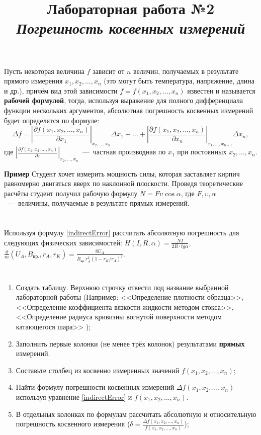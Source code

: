 \documentclass[14pt,a4paper]{article}
\title{Лабораторная работа №2 \\ \textit{Погрешность косвенных измерений}}
\begin{document}
\maketitle
Пусть некоторая величина $f$ зависит от $n$ величин, получаемых в результате прямого измерения  $x_1, x_2, \ldots, x_n$ (это могут быть температура, напряжение, длина и др.), причём вид этой зависимости $f = f(x_1, x_2, \ldots, x_n)$ известен и называется \textbf{рабочей формулой}, тогда, используя выражение для полного дифференциала функции нескольких аргументов, абсолютная погрешность косвенных измерений будет определятся по формуле:
\begin{equation} \label{indirectError}
    \Delta f = \left | \frac{\partial f(x_1, x_2, \ldots, x_n)}{\partial x_1} \right |_{x_2, \ldots, x_n} \Delta x_1 + \ldots + \left | \frac{\partial f(x_1, x_2, \ldots, x_n)}{\partial x_n} \right |_{x_1, \ldots, x_{n-1}} \Delta x_n,
\end{equation}
где $\left | \frac{\partial f(x_1, x_2, \ldots, x_n)}{\partial x} \right |_{x_2, \ldots, x_n}$~---~частная производная по $x_1$ при постоянных $x_2, \ldots, x_n$.

\textbf{Пример}
Студент хочет измерить мощность силы, которая заставляет кирпич равномерно двигаться вверх по наклонной плоскости. Проведя теоретические расчёты студент получил рабочую формулу $N = F\upsilon\cos{\alpha}$, где $F, \upsilon, \alpha$~---~величины, получаемые в результате прямых измерений.

\progress{}
\section{}
Используя формулу \ref{indirectError} рассчитать абсолютную погрешность для следующих физических зависимостей:
$H(I,R,\alpha) = \frac{NI}{2R\cdot tg\alpha}$, $\frac{q}{m}(U_A, B_\text{кр.}, r_A, r_K) = \frac{8U_A}{B_\text{кр.}r_A^2(1-r_K/r_A)^2}$. \\
\section{}
\begin{enumerate}
    \item Создать таблицу. Верхнюю строчку отвести под название выбранной лабораторной работы (Например: <<Определение плотности образца>>, <<Определение  коэффициента вязкости жидкости  методом стокса>>, <<Определение радиуса кривизны вогнутой поверхности методом катающегося шара>> );
    \item Заполнить первые колонки (не менее трёх колонок) результатами \textbf{прямых} измерений.
    \item Составьте столбец из косвенно измеренных значений $f(x_1, x_2, \ldots, x_n)$;
    \item Найти формулу погрешности косвенных измерений $\Delta f(x_1, x_2, \ldots, x_n)$ используя уравнение \ref{indirectError} и $f(x_1, x_2, \ldots, x_n)$. 
    \item В отдельных колонках по формулам рассчитать абсолютную и относительную погрешность косвенного измерения ($\delta  = \frac{\Delta f(x_1, x_2, \ldots, x_n)}{f(x_1, x_2, \ldots, x_n)}$);
\end{enumerate}
\end{document}
